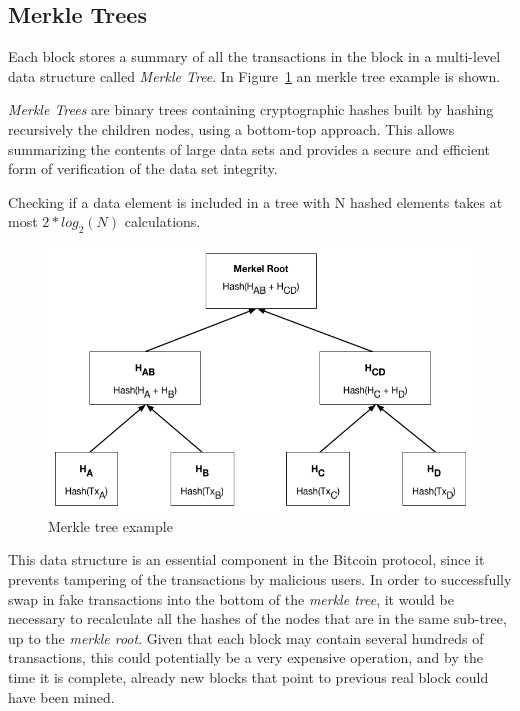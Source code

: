 \subsection{Merkle Trees}
Each block stores a summary of all the transactions in the block in a multi-level data structure called \textit{Merkle Tree}.
In Figure~\ref{fig:merkle-tree} an merkle tree example is shown.

\textit{Merkle Trees} are binary trees containing cryptographic hashes built by hashing recursively the children nodes, using a bottom-top approach.
This allows summarizing the contents of large data sets and provides a secure and efficient form of verification of the data set integrity.

Checking if a data element is included in a tree with N hashed elements takes at most \(2*log_2(N)\) calculations.

\begin{figure}
    \includegraphics[width=\linewidth]{Figures/merkle-tree.png}
    \caption{Merkle tree example}
    \label{fig:merkle-tree}
\end{figure}

This data structure is an essential component in the Bitcoin protocol, since it prevents tampering of the transactions by malicious users. In order to successfully swap in fake transactions into the bottom of the \textit{merkle tree}, it would be necessary to recalculate all the hashes of the nodes that are in the same sub-tree, up to the \textit{merkle root}. Given that each block may contain several hundreds of transactions, this could potentially be a very expensive operation, and by the time it is complete, already new blocks that point to previous real block could have been mined.

